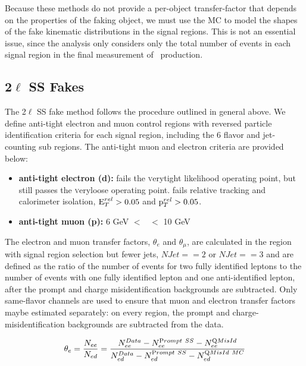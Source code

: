 Because these methods do not provide a per-object transfer-factor that depends on the properties of the faking object, we must use the MC to model the shapes of the fake kinematic distributions in the signal regions. This is not an essential issue, since the analysis only considers only the total number of events in each signal region in the final measurement of \tth\ production.

\subsection{2$\ell$ SS Fakes}
The 2$\ell$ SS fake method follows the procedure outlined in general above. We define anti-tight electron and muon control regions with reversed particle identification criteria for each signal region, including the 6 flavor and jet-counting sub regions. The anti-tight muon and electron criteria are provided below:
  
\begin{itemize}

\item \textbf{anti-tight electron (d):} fails the {\textsc verytight} likelihood operating point, but still passes the {\textsc veryloose} operating point. fails relative tracking and calorimeter isolation, $\rm E_{T}^{rel}>0.05$ and $\rm p_{T}^{rel}>0.05$.

\item \textbf{anti-tight muon (p):} 6 GeV $<$ \pt\ $<$ 10 GeV

\end{itemize}

The electron and muon transfer factors, $\theta_e$ and $\theta_{\mu}$, are calculated in the region with signal region selection but fewer jets, $NJet == 2$ or $NJet ==3$ and are defined as the ratio of the number of events for two fully identified leptons to the number of events with one fully identified lepton and one anti-identified lepton, after the prompt and charge misidentification backgrounds are subtracted. Only same-flavor channels are used to ensure that muon and electron transfer factors maybe estimated separately:
on every region, the prompt and charge-misidentification backgrounds are subtracted from the data. 

 \begin{equation}
 \theta_{e} = \frac{N_{ee}}{N_{ed}}= \frac{  N^{Data}_{ee} - N^{\rm
 Prompt~SS}_{ee} - N^{\rm QMisId}_{ee} }{ N_{ed}^{Data} - N^{\rm
 Prompt~SS}_{ed} - N^{\rm QMisId~MC}_{ed} } 
\end{equation}
\label{equation:ss_def_thee}


